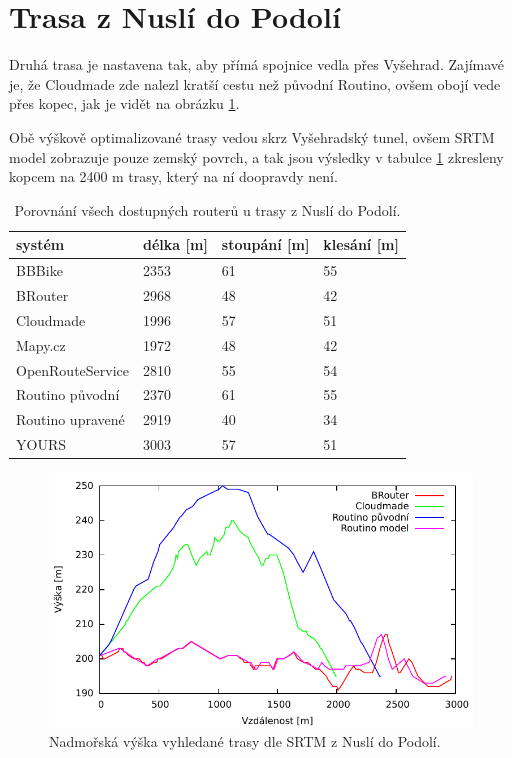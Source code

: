 \documentclass[thesis=B,czech]{FITthesis}[2012/06/26]
\begin{document}
\section{Trasa z Nuslí do Podolí}
Druhá trasa je nastavena tak, aby přímá spojnice vedla přes Vyšehrad. Zajímavé je, že Cloudmade zde nalezl kratší cestu než původní Routino, ovšem obojí vede přes kopec, jak je vidět na obrázku \ref{img:vyska-n}. 

Obě výškově optimalizované trasy vedou skrz Vyšehradský tunel, ovšem SRTM model zobrazuje pouze zemský povrch, a tak jsou výsledky v tabulce \ref{table:n} zkresleny kopcem na 2400 m trasy, který na ní doopravdy není.


\begin{table}[h!]
\begin{tabular}{l|l|l|l} %
\textbf{systém}	&	\textbf{délka [m]}	&	\textbf{stoupání [m]}	&	\textbf{klesání [m]}	\\
\hline
BBBike	&	2353 & 61	&	55	 \\
BRouter	&	2968 & 48	&	42	 \\
Cloudmade	&	1996 & 57	&	51	 \\
Mapy.cz	&	1972 & 48	&	42	 \\
OpenRouteService	&	2810 & 55	&	54	 \\
Routino původní	&	2370 & 61	&	55	 \\
Routino upravené	&	2919 & 40	&	34	 \\
YOURS	&	3003 & 57	&	51	 \\
\end{tabular}
\caption{Porovnání všech dostupných routerů u trasy z Nuslí do Podolí.}
\label{table:n}
\end{table}

\begin{figure}[!ht]
\centering
\includegraphics[width=\columnwidth]{porovnani/ele-nus.pdf}
\caption{Nadmořská výška vyhledané trasy dle SRTM z Nuslí do Podolí. }
\label{img:vyska-n}
\end{figure}
\end{document}
